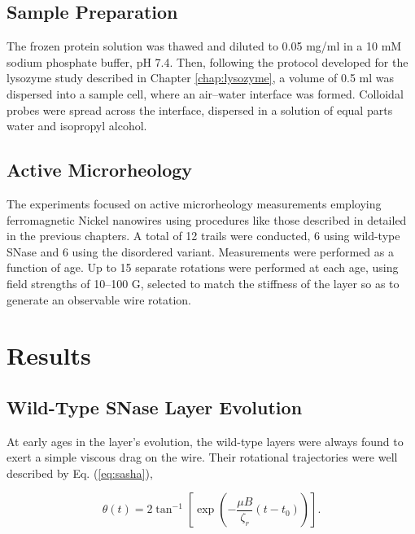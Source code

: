 \subsection{Sample Preparation}

The frozen protein solution was thawed and diluted to 0.05 mg/ml in a 10 mM sodium phosphate buffer, pH 7.4. Then, following the protocol developed for the lysozyme study described in Chapter \ref{chap:lysozyme}, a volume of 0.5 ml was dispersed into a sample cell, where an air--water interface was formed. Colloidal probes were spread across the interface, dispersed in a solution of equal parts water and isopropyl alcohol.

\subsection{Active Microrheology}

The experiments focused on active microrheology measurements employing ferromagnetic Nickel nanowires using procedures like those described in detailed in the previous chapters. A total of 12 trails were conducted, 6 using wild-type SNase and 6 using the disordered variant. Measurements were performed as a function of age. Up to 15 separate rotations were performed at each age, using field strengths of 10--100 G, selected to match the stiffness of the layer so as to generate an observable wire rotation.


\section{Results}
\subsection{Wild-Type SNase Layer Evolution}

At early ages in the layer's evolution, the wild-type layers were always found to exert a simple viscous drag on the wire. Their rotational trajectories were well described by Eq. (\ref{eq:sasha}),

\begin{equation*}
 \theta(t) = 2 \tan^{-1} \left[ \exp \left( -\frac{\mu B}{\zeta_r} (t-t_0) \right) \right].
\end{equation*}

